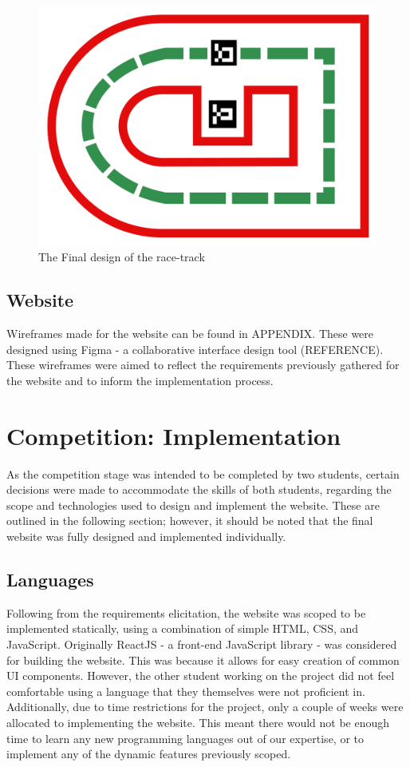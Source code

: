 \documentclass{l4proj}
\begin{document}
\begin{figure}
    \centering
    \includegraphics[width=0.5\linewidth]{images/final_track_design.png}
    \caption{The Final design of the race-track}
    \label{fig:deepcar}
\end{figure}

\section{Website}
Wireframes made for the website can be found in APPENDIX. These were designed using Figma - a collaborative interface design tool (REFERENCE). These wireframes were aimed to reflect the requirements previously gathered for the website and to inform the implementation process.

\chapter{Competition: Implementation}
As the competition stage was intended to be completed by two students, certain decisions were made to accommodate the skills of both students, regarding the scope and technologies used to design and implement the website. These are outlined in the following section; however, it should be noted that the final website was fully designed and implemented individually.

\section{Languages}
Following from the requirements elicitation, the website was scoped to be implemented statically, using a combination of simple HTML, CSS, and JavaScript. Originally ReactJS - a front-end JavaScript library - was considered for building the website. This was because it allows for easy creation of common UI components. However, the other student working on the project did not feel comfortable using a language that they themselves were not proficient in. Additionally, due to time restrictions for the project, only a couple of weeks were allocated to implementing the website. This meant there would not be enough time to learn any new programming languages out of our expertise, or to implement any of the dynamic features previously scoped.
\end{document}
